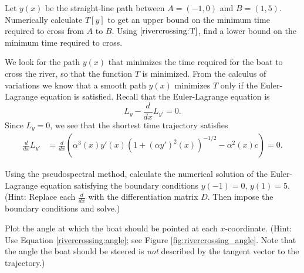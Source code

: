 \begin{problem}
	Let $y(x)$ be the straight-line path between $A = (-1,0)$ and $B=(1,5)$. Numerically calculate $T[y]$ to get an upper bound on the minimum time required to cross from $A$ to $B$. Using $\eqref{rivercrossing:T}$, find a lower bound on the minimum time required to cross.
\end{problem}

We look for the path $y(x)$ that minimizes the time required for the boat to cross the river, so that the function $T$ is minimized. From the calculus of variations we know that a smooth path $y(x)$ minimizes $T$ only if the Euler-Lagrange equation is satisfied. Recall that the Euler-Lagrange equation is 
\[
L_{y} - \frac{d}{dx}L_{y'} = 0.
\]
Since $L_y = 0$, we see that the shortest time trajectory satisfies
\begin{align*}
	\frac{d}{dx}L_{y'} &=  \frac{d}{dx}\left( \alpha^3(x) y'(x) (1 + (\alpha y')^2(x))^{-1/2} - \alpha^2(x) c \right) = 0.
\end{align*}

\begin{problem}
Using the pseudospectral method, calculate the numerical solution of the Euler-Lagrange equation satisfying the boundary conditions $y(-1) = 0$, $y(1) = 5$. (Hint: Replace each $\frac{d}{dx}$ with the differentiation matrix $D$. Then impose the boundary conditions and solve.)
\end{problem}

\begin{problem}
Plot the angle at which the boat should be pointed at each $x$-coordinate. (Hint: Use  Equation \eqref{rivercrossing:angle}; see Figure \ref{fig:rivercrossing_angle}. Note that the angle the boat should be steered is \emph{not} described by the tangent vector to the trajectory.)

\end{problem}

